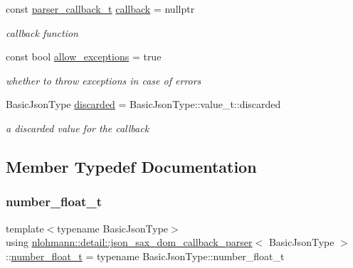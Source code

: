 \begin{DoxyCompactItemize}
const \hyperlink{classnlohmann_1_1detail_1_1json__sax__dom__callback__parser_a4f636086fa8e7cf26c35c8afd50903ce}{parser\+\_\+callback\+\_\+t} \hyperlink{classnlohmann_1_1detail_1_1json__sax__dom__callback__parser_a46a72dffd5be4a25602af00f0033c126}{callback} = nullptr
\begin{DoxyCompactList}\small\item\em callback function \end{DoxyCompactList}\item 
const bool \hyperlink{classnlohmann_1_1detail_1_1json__sax__dom__callback__parser_a0a1390c23e2a3da774d75c050f9b3f13}{allow\+\_\+exceptions} = true
\begin{DoxyCompactList}\small\item\em whether to throw exceptions in case of errors \end{DoxyCompactList}\item 
Basic\+Json\+Type \hyperlink{classnlohmann_1_1detail_1_1json__sax__dom__callback__parser_a8997ee6dc3bd39116b951465b946445e}{discarded} = Basic\+Json\+Type\+::value\+\_\+t\+::discarded
\begin{DoxyCompactList}\small\item\em a discarded value for the callback \end{DoxyCompactList}\end{DoxyCompactItemize}


\subsection{Member Typedef Documentation}
\mbox{\label{classnlohmann_1_1detail_1_1json__sax__dom__callback__parser_a914ea0555cea5290449fb791ae41c655}} 
\subsubsection{\texorpdfstring{number\+\_\+float\+\_\+t}{number\_float\_t}}
{\footnotesize\ttfamily template$<$typename Basic\+Json\+Type$>$ \\
using \hyperlink{classnlohmann_1_1detail_1_1json__sax__dom__callback__parser}{nlohmann\+::detail\+::json\+\_\+sax\+\_\+dom\+\_\+callback\+\_\+parser}$<$ Basic\+Json\+Type $>$\+::\hyperlink{classnlohmann_1_1detail_1_1json__sax__dom__callback__parser_a914ea0555cea5290449fb791ae41c655}{number\+\_\+float\+\_\+t} =  typename Basic\+Json\+Type\+::number\+\_\+float\+\_\+t}

